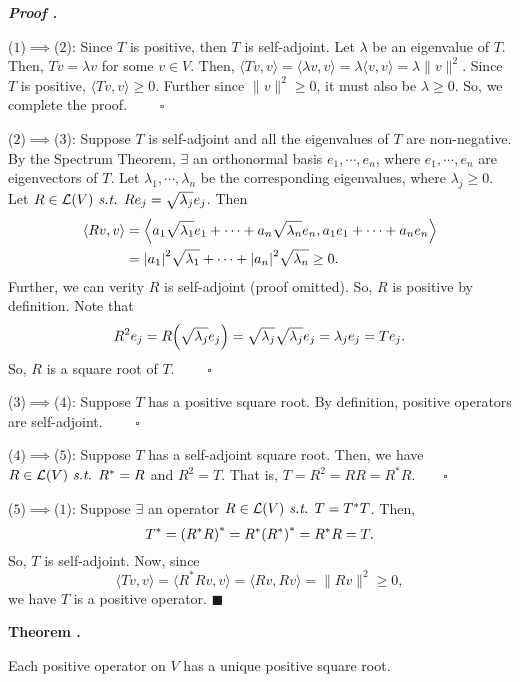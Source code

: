 \documentclass[11pt, letterpaper]{article}
\newcounter{index}[subsection]
\newenvironment*{thm}[1]{\begin{tcolorbox}\par\noindent\textbf{Theorem \thesubsection.\stepcounter{index}\theindex\ #1} \par}{\par\end{tcolorbox}}
\newcounter{nprf}[subsection]
\newenvironment*{prf}{\par\indent\textbf{\textit{Proof \stepcounter{nprf}\thenprf.}}}{\hfill$\blacksquare$\par}
\def\L{\mathcal{L}}
\def\st{\emph{ s.t. }}
\def\pqde{\qquad\square}
\begin{document}
\begin{prf}
	\par ($1$)$\implies$($2$): Since $T$ is positive, then $T$ is self-adjoint. Let $\lambda$ be an eigenvalue of $T$. Then, $Tv=\lambda v$ for some $v\in V$. Then, $\langle Tv,v\rangle=\langle\lambda v,v\rangle=\lambda\langle v,v\rangle=\lambda\|v\|^2$. Since $T$ is positive, $\langle Tv,v\rangle\geq0$. Further since $\|v\|^2\geq0$, it must also be $\lambda\geq0$. So, we complete the proof. $\pqde$\par 
	($2$)$\implies$($3$): Suppose $T$ is self-adjoint and all the eigenvalues of $T$ are non-negative. By the Spectrum Theorem, $\exists$ an orthonormal basis $e_1,\cdots,e_n$, where $e_1,\cdots,e_n$ are eigenvectors of $T$. Let $\lambda_1,\cdots,\lambda_n$ be the corresponding eigenvalues, where $\lambda_j\geq0$. Let $R\in\L(V)\st Re_j=\sqrt{\lambda_j}e_j$. Then \[\begin{aligned}\langle Rv,v\rangle&=\Big\langle a_1\sqrt{\lambda_1}e_1+\cdots+a_n\sqrt{\lambda_n}e_n,a_1e_1+\cdots+a_ne_n\Big\rangle\\&=\qty|a_1|^2\sqrt{\lambda_1}+\cdots+\qty|a_n|^2\sqrt{\lambda_n}\geq0.\end{aligned}\] Further, we can verity $R$ is self-adjoint (proof omitted). So, $R$ is positive by definition. Note that \[R^2e_j=R\qty(\sqrt{\lambda_j}e_j)=\sqrt{\lambda_j}\sqrt{\lambda_j}e_j=\lambda_je_j=Te_j.\] So, $R$ is a square root of $T$. $\pqde$\par 
	($3$)$\implies$($4$): Suppose $T$ has a positive square root. By definition, positive operators are self-adjoint. $\pqde$\par 
	($4$)$\implies$($5$): Suppose $T$ has a self-adjoint square root. Then, we have $R\in\L(V)\st R^*=R$ and $R^2=T$. That is, $T=R^2=RR=R^*R.\pqde$\par 
	($5$)$\implies$($1$): Suppose $\exists$ an operator $R\in\L(V)\st T=T^*T$. Then, \[T^*=\qty(R^*R)^*=R^*\qty(R^*)^*=R^*R=T.\] So, $T$ is self-adjoint. Now, since \[\langle Tv,v\rangle=\langle R^*Rv,v\rangle=\langle Rv,Rv\rangle=\|Rv\|^2\geq0,\] we have $T$ is a positive operator. 
\end{prf}
\begin{thm}{}
	Each positive operator on $V$ has a unique positive square root.	
\end{thm}
\end{document}
